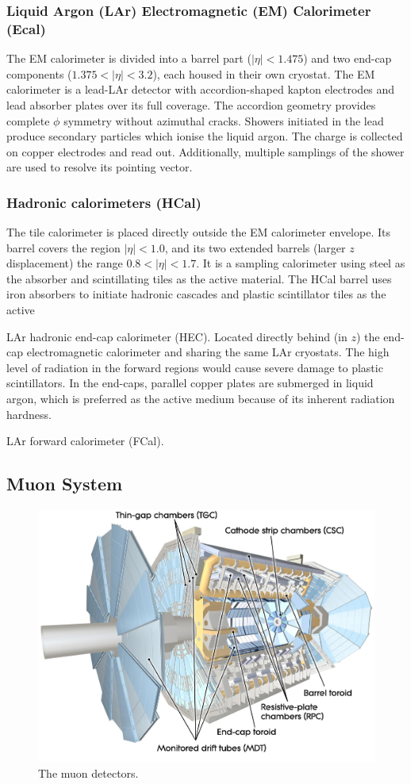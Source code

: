 \subsubsection{Liquid Argon (LAr) Electromagnetic (EM) Calorimeter (Ecal)}
The EM calorimeter is divided into a barrel part ($|\eta| < 1.475$) and two end-cap components ($1.375 < |\eta| < 3.2$), each housed in their own cryostat. The EM calorimeter is a lead-LAr detector with accordion-shaped kapton electrodes and lead absorber plates over its full coverage. The accordion geometry provides complete $\phi$ symmetry without azimuthal cracks. Showers initiated in the lead produce secondary particles which ionise the liquid argon. The charge is collected on copper electrodes and read out. Additionally, multiple samplings of the shower are used to resolve its pointing vector.

\subsubsection{Hadronic calorimeters (HCal)}
The tile calorimeter is placed directly outside the EM calorimeter envelope. Its barrel covers the region $|\eta| < 1.0$, and its two extended barrels (larger $z$ displacement) the range $0.8 < |\eta| < 1.7$. It is a sampling calorimeter using steel as the absorber and scintillating tiles as the active material. The HCal barrel uses iron absorbers to initiate hadronic cascades and plastic scintillator tiles as the active

LAr hadronic end-cap calorimeter (HEC). Located directly behind (in $z$) the end-cap electromagnetic calorimeter and sharing the same LAr cryostats. The high level of radiation in the forward regions would cause severe damage to plastic scintillators. In the end-caps, parallel copper plates are submerged in liquid argon, which is preferred as the active medium because of its inherent radiation hardness.

LAr forward calorimeter (FCal).


\subsection{Muon System}

%
\begin{figure}[!htpb]
  \centering
  \includegraphics[width=0.4\linewidth]{chapters/2.detector/figs/atlas_muon_system.jpg}
  \caption{The \ATLAS muon detectors.}
  \label{fig:atlas_muon_system}
\end{figure}
%


